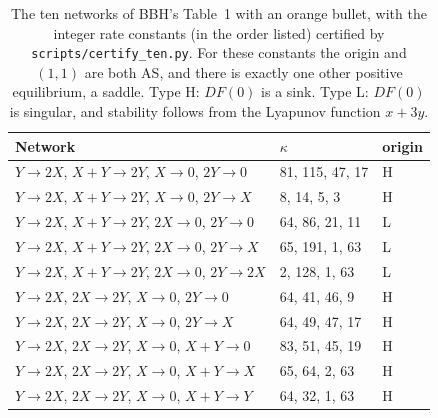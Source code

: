 \documentclass[11pt,a4paper]{report}
\begin{document}
\begin{table}[ht]
\centering
\caption{The ten networks of BBH's Table~1 with an orange bullet, with the integer rate constants (in the order
listed) certified by \texttt{scripts/certify\_ten.py}. For these constants the origin and \((1,1)\) are both AS, and
there is exactly one other positive equilibrium, a saddle. Type H: \(DF(0)\) is a sink. Type L: \(DF(0)\) is singular,
and stability follows from the Lyapunov function \(x+3y\).}\label{tab:ten}
\small
\begin{tabular}{lll}
\hline
Network & \(\kappa\) & origin \\
\hline
\(Y\to2X\), \(X+Y\to2Y\), \(X\to0\), \(2Y\to0\) & 81, 115, 47, 17 & H \\
\(Y\to2X\), \(X+Y\to2Y\), \(X\to0\), \(2Y\to X\) & 8, 14, 5, 3 & H \\
\(Y\to2X\), \(X+Y\to2Y\), \(2X\to0\), \(2Y\to0\) & 64, 86, 21, 11 & L \\
\(Y\to2X\), \(X+Y\to2Y\), \(2X\to0\), \(2Y\to X\) & 65, 191, 1, 63 & L \\
\(Y\to2X\), \(X+Y\to2Y\), \(2X\to0\), \(2Y\to2X\) & 2, 128, 1, 63 & L \\
\(Y\to2X\), \(2X\to2Y\), \(X\to0\), \(2Y\to0\) & 64, 41, 46, 9 & H \\
\(Y\to2X\), \(2X\to2Y\), \(X\to0\), \(2Y\to X\) & 64, 49, 47, 17 & H \\
\(Y\to2X\), \(2X\to2Y\), \(X\to0\), \(X+Y\to0\) & 83, 51, 45, 19 & H \\
\(Y\to2X\), \(2X\to2Y\), \(X\to0\), \(X+Y\to X\) & 65, 64, 2, 63 & H \\
\(Y\to2X\), \(2X\to2Y\), \(X\to0\), \(X+Y\to Y\) & 64, 32, 1, 63 & H \\
\hline
\end{tabular}
\end{table}
\end{document}
